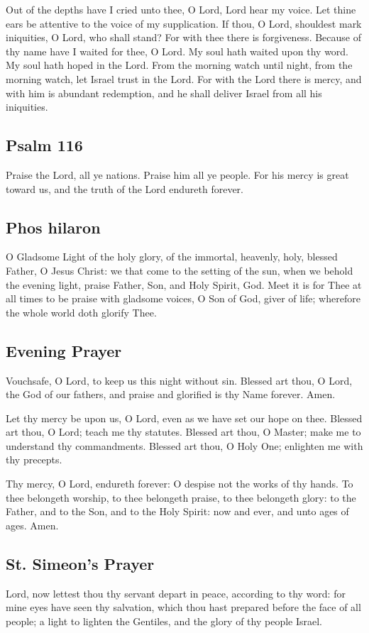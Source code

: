 Out of the depths have I cried unto thee, O Lord, Lord hear my voice. Let thine ears be attentive to the voice of my supplication.  If thou, O Lord, shouldest mark iniquities, O Lord, who shall stand? For with thee there is forgiveness. Because of thy name have I waited for thee, O Lord. My soul hath waited upon thy word. My soul hath hoped in the Lord. From the morning watch until night, from the morning watch, let Israel trust in the Lord. For with the Lord there is mercy, and with him is abundant redemption, and he shall deliver Israel from all his iniquities.

\subsection{Psalm 116}

Praise the Lord, all ye nations. Praise him all ye people. For his mercy is great toward  us, and the truth of the Lord endureth forever.

\subsection{Phos hilaron}

O Gladsome Light of the holy glory, of the immortal, heavenly, holy, blessed Father, O Jesus Christ: we that come to the setting of the sun, when we behold the evening light, praise Father, Son, and Holy Spirit, God. Meet it is for Thee at all times to be praise with gladsome voices, O Son of God, giver of life; wherefore the whole world doth glorify Thee.

\subsection{Evening Prayer}

Vouchsafe, O Lord, to keep us this night without sin. Blessed art thou, O Lord, the God of our fathers, and praise and glorified is thy Name forever. Amen.

Let thy mercy be upon us, O Lord, even as we have set our hope on thee. Blessed art thou, O Lord; teach me thy statutes. Blessed art thou, O Master; make me to understand thy commandments. Blessed art thou, O Holy One; enlighten me with thy precepts.

Thy mercy, O Lord, endureth forever: O despise not the works of thy hands. To thee belongeth worship, to thee belongeth praise, to thee belongeth glory: to the Father, and to the Son, and to the Holy Spirit: now and ever, and unto ages of ages. Amen.

\subsection{St. Simeon's Prayer}

Lord, now lettest thou thy servant depart in peace, according to thy word: for mine eyes have seen thy salvation, which thou hast prepared before the face of all people; a light to lighten the Gentiles, and the glory of thy people Israel.

\cleardoublepage

